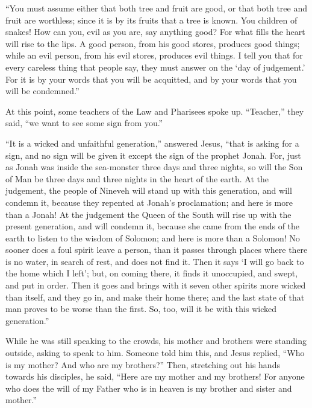  ``You must assume either that both tree and fruit are
good, or that both tree and fruit are worthless; since it is by its
fruits that a tree is known.  You children of snakes! How
can you, evil as you are, say anything good? For what fills the heart
will rise to the lips.  A good person, from his good
stores, produces good things; while an evil person, from his evil
stores, produces evil things.  I tell you that for every
careless thing that people say, they must answer on the `day of
judgement.'  For it is by your words that you will be
acquitted, and by your words that you will be condemned.''

 At this point, some teachers of the Law and Pharisees
spoke up. ``Teacher,'' they said, ``we want to see some sign from you.''

 ``It is a wicked and unfaithful generation,'' answered
Jesus, ``that is asking for a sign, and no sign will be given it except
the sign of the prophet Jonah.  For, just as Jonah was
inside the sea-monster three days and three nights, so will the Son of
Man be three days and three nights in the heart of the earth.
 At the judgement, the people of Nineveh will stand up with
this generation, and will condemn it, because they repented at Jonah's
proclamation; and here is more than a Jonah!  At the
judgement the Queen of the South will rise up with the present
generation, and will condemn it, because she came from the ends of the
earth to listen to the wisdom of Solomon; and here is more than a
Solomon!  No sooner does a foul spirit leave a person, than
it passes through places where there is no water, in search of rest, and
does not find it.  Then it says `I will go back to the home
which I left'; but, on coming there, it finds it unoccupied, and swept,
and put in order.  Then it goes and brings with it seven
other spirits more wicked than itself, and they go in, and make their
home there; and the last state of that man proves to be worse than the
first. So, too, will it be with this wicked generation.''

 While he was still speaking to the crowds, his mother and
brothers were standing outside, asking to speak to him. 
Someone told him this, and Jesus replied,  ``Who is my
mother? And who are my brothers?''  Then, stretching out
his hands towards his disciples, he said, ``Here are my mother and my
brothers!  For anyone who does the will of my Father who is
in heaven is my brother and sister and mother.''

